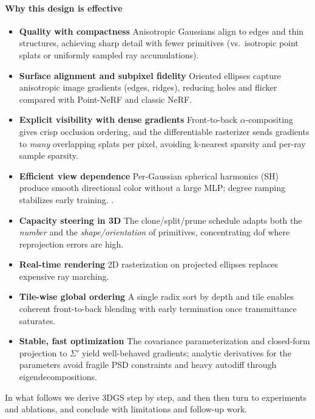 \begin{enrichment}
\begin{enrichment}
\begin{enrichment}
        \paragraph{Why this design is effective}
        \begin{itemize}
            \item \textbf{Quality with compactness} Anisotropic Gaussians align to edges and thin structures, achieving sharp detail with fewer primitives (vs.\ isotropic point splats or uniformly sampled ray accumulations).
            \item \textbf{Surface alignment and subpixel fidelity} Oriented ellipses capture anisotropic image gradients (edges, ridges), reducing holes and flicker compared with Point-NeRF and classic NeRF.
            \item \textbf{Explicit visibility with dense gradients} Front-to-back $\alpha$-compositing gives crisp occlusion ordering, and the differentiable rasterizer sends gradients to \emph{many} overlapping splats per pixel, avoiding k-nearest sparsity and per-ray sample sparsity.
            \item \textbf{Efficient view dependence} Per-Gaussian spherical harmonics (SH) produce smooth directional color without a large MLP; degree ramping stabilizes early training. \cite{kerbl2023_3dgaussiansplatting}.
            \item \textbf{Capacity steering in 3D} The clone/split/prune schedule adapts both the \emph{number} and the \emph{shape/orientation} of primitives, concentrating dof where reprojection errors are high.
            \item \textbf{Real-time rendering} 2D rasterization on projected ellipses replaces expensive ray marching.
            \item \textbf{Tile-wise global ordering} A single radix sort by depth and tile enables coherent front-to-back blending with early termination once transmittance saturates.
            \item \textbf{Stable, fast optimization} The covariance parameterization and closed-form projection to $\Sigma'$ yield well-behaved gradients; analytic derivatives for the parameters avoid fragile PSD constraints and heavy autodiff through eigendecompositions.
        \end{itemize}
        In what follows we derive 3DGS step by step, and then then turn to experiments and ablations, and conclude with limitations and follow-up work.
        
        \newpage
        

\end{enrichment}
\end{enrichment}
\end{enrichment}
